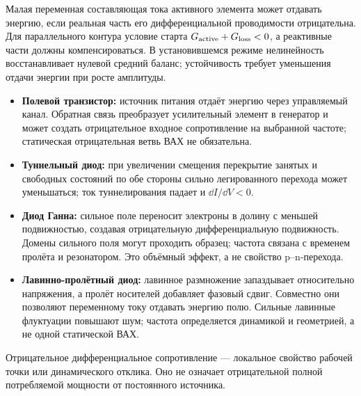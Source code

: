 
Малая переменная составляющая тока активного элемента может отдавать энергию, если реальная часть его дифференциальной проводимости отрицательна. Для параллельного контура условие старта $G_{\rm active}+G_{\rm loss}<0$, а реактивные части должны компенсироваться. В установившемся режиме нелинейность восстанавливает нулевой средний баланс; устойчивость требует уменьшения отдачи энергии при росте амплитуды.

\begin{itemize}
\item \textbf{Полевой транзистор:} источник питания отдаёт энергию через управляемый канал. Обратная связь преобразует усилительный элемент в генератор и может создать отрицательное входное сопротивление на выбранной частоте; статическая отрицательная ветвь ВАХ не обязательна.
\item \textbf{Туннельный диод:} при увеличении смещения перекрытие занятых и свободных состояний по обе стороны сильно легированного перехода может уменьшаться; ток туннелирования падает и $\dd I/\dd V<0$.
\item \textbf{Диод Ганна:} сильное поле переносит электроны в долину с меньшей подвижностью, создавая отрицательную дифференциальную подвижность. Домены сильного поля могут проходить образец; частота связана с временем пролёта и резонатором. Это объёмный эффект, а не свойство p--n-перехода.
\item \textbf{Лавинно-пролётный диод:} лавинное размножение запаздывает относительно напряжения, а пролёт носителей добавляет фазовый сдвиг. Совместно они позволяют переменному току отдавать энергию полю. Сильные лавинные флуктуации повышают шум; частота определяется динамикой и геометрией, а не одной статической ВАХ.
\end{itemize}
Отрицательное дифференциальное сопротивление — локальное свойство рабочей точки или динамического отклика. Оно не означает отрицательной полной потребляемой мощности от постоянного источника.
